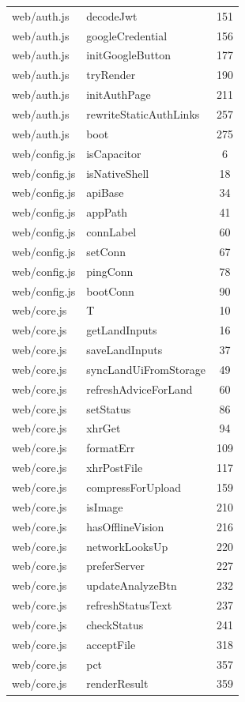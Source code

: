 \begin{center}
\begin{longtable}{@{}p{4.6cm}p{5.2cm}c@{}}
web/auth.js & decodeJwt & 151 \\
web/auth.js & googleCredential & 156 \\
web/auth.js & initGoogleButton & 177 \\
web/auth.js & tryRender & 190 \\
web/auth.js & initAuthPage & 211 \\
web/auth.js & rewriteStaticAuthLinks & 257 \\
web/auth.js & boot & 275 \\
web/config.js & isCapacitor & 6 \\
web/config.js & isNativeShell & 18 \\
web/config.js & apiBase & 34 \\
web/config.js & appPath & 41 \\
web/config.js & connLabel & 60 \\
web/config.js & setConn & 67 \\
web/config.js & pingConn & 78 \\
web/config.js & bootConn & 90 \\
web/core.js & T & 10 \\
web/core.js & getLandInputs & 16 \\
web/core.js & saveLandInputs & 37 \\
web/core.js & syncLandUiFromStorage & 49 \\
web/core.js & refreshAdviceForLand & 60 \\
web/core.js & setStatus & 86 \\
web/core.js & xhrGet & 94 \\
web/core.js & formatErr & 109 \\
web/core.js & xhrPostFile & 117 \\
web/core.js & compressForUpload & 159 \\
web/core.js & isImage & 210 \\
web/core.js & hasOfflineVision & 216 \\
web/core.js & networkLooksUp & 220 \\
web/core.js & preferServer & 227 \\
web/core.js & updateAnalyzeBtn & 232 \\
web/core.js & refreshStatusText & 237 \\
web/core.js & checkStatus & 241 \\
web/core.js & acceptFile & 318 \\
web/core.js & pct & 357 \\
web/core.js & renderResult & 359 \\

\end{longtable}
\end{center}
